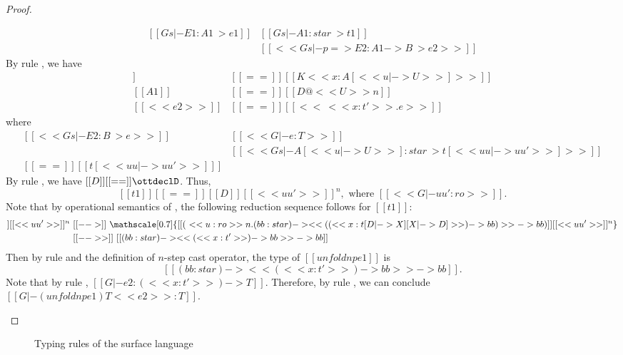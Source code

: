 \begin{proof}
\begin{description}
\[\begin{array}{ll}
                [[Gs |- E1 : A1 ~> e1]] &
                [[Gs |- A1 : star ~> t1]] \\
                [[G |- e1 : t1]] &
                [[<< Gs |- p => E2 : A1 -> B ~> e2 >>]]            
            \end{array}\]
            By rule , we have
            \begin{align*}
                [[p]] &[[==]] [[K <<x:A[<< u |-> U >>]>>]] \\
                [[A1]] &[[==]] [[D@<<U>>n]] \\
                [[<<e2>>]] &[[==]] [[<<\ <<x:t'>> .e>>]]
            \end{align*}
            where
            \[\begin{array}{ll}
                [[<<Gs |- E2 : B ~> e>>]] &
                [[<<G |- e : T>>]] \\
                [[<<Gs |- U : star ~> uu'>>]] &
                [[<<Gs |- A[<< u |-> U >>]:star ~> t[<<uu |-> uu'>>]>>]] \\
                [[t']] [[==]] [[ t[<<uu |-> uu'>>] ]]
            \end{array}\]
            By rule , we have $[[D]]  [[ == ]] \ottdeclD$. Thus,
            \[ [[t1]] [[==]] [[D]] [[<<uu'>>]]^n,\text{ where }[[<<G |- uu' : ro>>]].\] 
            Note that by operational semantics of \name, the following reduction sequence follows for $[[t1]]$:
            \begin{align*}
                [[D]] [[<<uu'>>]]^n~
                &[[-->]]~ \mathscale[0.7]{[[(\ <<u:ro>>n . (bb:star) -> << ((<<x : t[D |-> X][X |-> D]>>) -> bb) >> -> bb) ]][[<<uu'>>]]^n}\\
                &[[-->>]]~ [[(bb:star) -> << (<<x:t'>>) -> bb >> -> bb]]
            \end{align*}
            Then by
            rule  and the definition of $n$-step cast operator, the
            type of $[[unfoldnp e1]]$ is \[ [[(bb:star) -> << (<<x:t'>>) -> bb >> -> bb]].\] Note
            that by rule , $[[G |- e2 : (<<x:t'>>) -> T]]$. Therefore, by rule
            , we can conclude $[[G |- (unfoldnp e1) T <<e2>> : T]]$.
    \end{description}
\end{proof}

\begin{figure*}
\renewcommand{\hlmath}[1]{}
\renewcommand{\ottdrulename}[1]{\textsc{\replace{#1}{TR}{TS}}}
\renewcommand{\ottcom}[1]{\text{\replace{#1}{translation}{typing}}}
\ottdefnctxtrans{}\ottinterrule
\ottdefnpgmtrans{}\ottinterrule
\ottdefndecltrans{}\ottinterrule %
\ottdefnpattrans{}\ottinterrule
\ottdefnexprtrans{}
\caption{Typing rules of the surface language}
\label{fig:appendix:typing}
\end{figure*}


